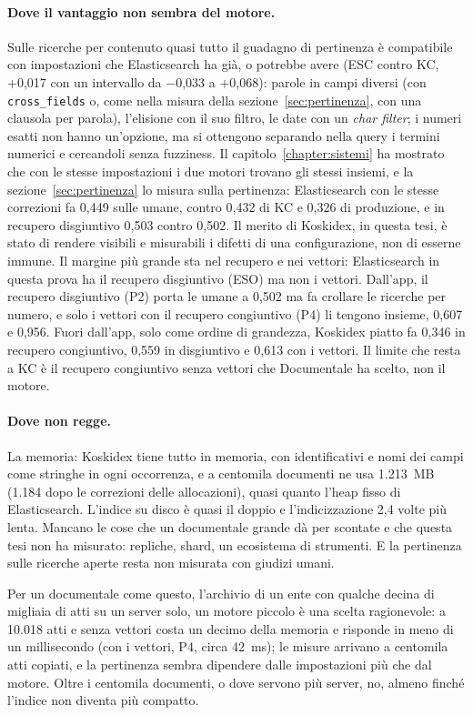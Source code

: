 \paragraph{Dove il vantaggio non sembra del motore.} Sulle ricerche per contenuto quasi
tutto il guadagno di pertinenza è compatibile con impostazioni che Elasticsearch ha già, o potrebbe avere
(ESC contro KC, +0,017 con un intervallo da $-$0,033 a $+$0,068):
parole in campi diversi (con \texttt{cross\_fields} o, come nella misura della
sezione~\ref{sec:pertinenza}, con una clausola per parola), l'elisione con il suo
filtro, le date con un \emph{char filter}; i numeri esatti non hanno
un'opzione, ma si ottengono separando nella query i termini numerici e
cercandoli senza fuzziness. Il capitolo~\ref{chapter:sistemi} ha
mostrato che con le stesse impostazioni i due motori trovano gli stessi
insiemi, e la sezione~\ref{sec:pertinenza} lo misura sulla pertinenza:
Elasticsearch con le stesse correzioni fa 0,449 sulle umane, contro 0,432 di KC
e 0,326 di produzione, e in recupero disgiuntivo 0,503 contro 0,502. Il merito
di Koskidex, in questa tesi, è stato di rendere visibili e misurabili i difetti
di una configurazione, non di esserne immune. Il margine più grande sta nel
recupero e nei vettori: Elasticsearch in questa prova ha il recupero disgiuntivo
(ESO) ma non i vettori. Dall'app, il
recupero disgiuntivo (P2) porta le umane a 0,502 ma fa crollare le ricerche per
numero, e solo i vettori con il recupero congiuntivo (P4) li tengono insieme,
0,607 e 0,956. Fuori dall'app, solo come ordine di grandezza, Koskidex piatto fa
0,346 in recupero congiuntivo, 0,559 in disgiuntivo e 0,613 con i vettori. Il
limite che resta a KC è il recupero congiuntivo senza vettori che Documentale ha
scelto, non il motore.

\paragraph{Dove non regge.} La memoria: Koskidex tiene tutto in memoria, con
identificativi e nomi dei campi come stringhe in ogni occorrenza, e a centomila
documenti ne usa 1.213~MB (1.184 dopo le correzioni delle allocazioni), quasi quanto l'heap fisso di Elasticsearch. L'indice
su disco è quasi il doppio e l'indicizzazione 2,4 volte più lenta. Mancano le cose che
un documentale grande dà per scontate e che questa tesi non ha misurato:
repliche, shard, un ecosistema di strumenti. E la pertinenza sulle ricerche
aperte resta non misurata con giudizi umani.

Per un documentale come questo, l'archivio di un ente con qualche decina di
migliaia di atti su un server solo, un motore piccolo è una scelta ragionevole:
a 10.018 atti e senza vettori costa un decimo della memoria e risponde in meno di
un millisecondo (con i vettori, P4, circa 42~ms); le misure arrivano a centomila
atti copiati, e la pertinenza sembra dipendere dalle impostazioni più che dal motore. Oltre i centomila
documenti, o dove servono più server, no, almeno finché l'indice non diventa
più compatto.
